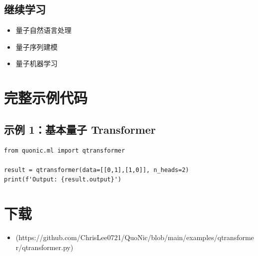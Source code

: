 \documentclass[12pt,a4paper]{article}
\begin{document}
\subsection{继续学习}
\begin{itemize}
  \item 量子自然语言处理
  \item 量子序列建模
  \item 量子机器学习
\end{itemize}

\section{完整示例代码}

\subsection{示例 1：基本量子 Transformer}

\begin{verbatim}
from quonic.ml import qtransformer

result = qtransformer(data=[[0,1],[1,0]], n_heads=2)
print(f'Output: {result.output}')
\end{verbatim}

\section{下载}

\begin{itemize}
  \item [qtransformer.py](https://github.com/ChrisLee0721/QuoNic/blob/main/examples/qtransformer/qtransformer.py)
\end{itemize}
\end{document}
